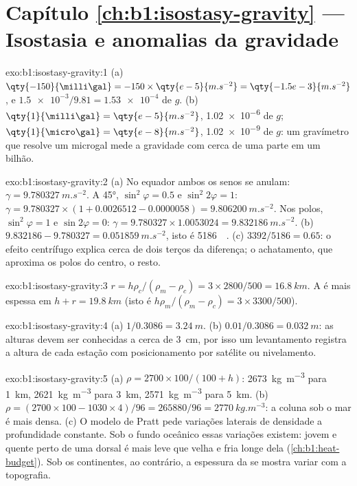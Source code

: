 \section*{Capítulo \ref{ch:b1:isostasy-gravity} --- Isostasia e anomalias da gravidade}

\begin{solution}{exo:b1:isostasy-gravity:1}
(a) $\qty{-150}{\milli\gal} = -150\times\qty{e-5}{m.s^{-2}} = \qty{-1.5e-3}{m.s^{-2}}$,
e $\num{1.5e-3}/9.81 = \num{1.53e-4}$ de $g$. (b) $\qty{1}{\milli\gal} =
\qty{e-5}{m.s^{-2}}$, \num{1.02e-6} de $g$; $\qty{1}{\micro\gal} =
\qty{e-8}{m.s^{-2}}$, \num{1.02e-9} de $g$: um gravímetro que resolve um microgal mede a gravidade com cerca de uma parte em um bilhão.
\end{solution}

\begin{solution}{exo:b1:isostasy-gravity:2}
(a) No equador ambos os senos se anulam: $\gamma = \qty{9.780327}{m.s^{-2}}$. A
\ang{45}, $\sin^2\varphi = 0.5$ e $\sin^2 2\varphi = 1$:
$\gamma = 9.780327\times(1 + 0.0026512 - 0.0000058) = \qty{9.806200}{m.s^{-2}}$.
Nos polos, $\sin^2\varphi = 1$ e $\sin 2\varphi = 0$:
$\gamma = 9.780327\times1.0053024 = \qty{9.832186}{m.s^{-2}}$.
(b) $9.832186 - 9.780327 = \qty{0.051859}{m.s^{-2}}$, isto é
\qty{5186}{\milli\gal}. (c) $3392/5186 = 0.65$: o efeito centrífugo explica
cerca de dois terços da diferença; o achatamento, que aproxima os polos do
centro, o resto.
\end{solution}

\begin{solution}{exo:b1:isostasy-gravity:3}
$r = h\rho_c/(\rho_m - \rho_c) = 3\times2800/500 = \qty{16.8}{km}$. A  é
mais espessa em $h + r = \qty{19.8}{km}$ (isto é $h\rho_m/(\rho_m - \rho_c) =
3\times3300/500$).
\end{solution}

\begin{solution}{exo:b1:isostasy-gravity:4}
(a) $1/0.3086 = \qty{3.24}{m}$. (b) $0.01/0.3086 = \qty{0.032}{m}$: as alturas
devem ser conhecidas a cerca de \qty{3}{cm}, por isso um levantamento registra a altura de cada
estação com posicionamento por satélite ou nivelamento.
\end{solution}

\begin{solution}{exo:b1:isostasy-gravity:5}
(a) $\rho = 2700\times100/(100 + h)$: \qty{2673}{kg.m^{-3}} para \qty{1}{km},
\qty{2621}{kg.m^{-3}} para \qty{3}{km}, \qty{2571}{kg.m^{-3}} para \qty{5}{km}.
(b) $\rho = (2700\times100 - 1030\times4)/96 = \num{265880}/96 =
\qty{2770}{kg.m^{-3}}$: a coluna sob o mar é mais densa. (c) O modelo de Pratt
pede variações laterais de densidade a profundidade constante. Sob o fundo oceânico
essas variações existem:  jovem e quente perto de uma dorsal é mais leve que 
velha e fria longe dela (\cref{ch:b1:heat-budget}). Sob os continentes, ao contrário,
a espessura da  se mostra variar com a topografia.
\end{solution}

